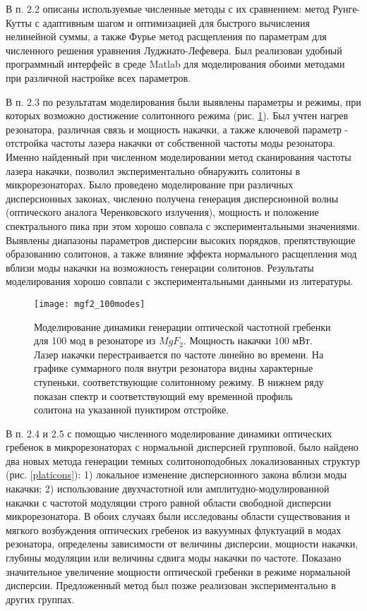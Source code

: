 В п. 2.2 описаны используемые численные методы с их сравнением: метод Рунге-Кутты с адаптивным шагом и оптимизацией для быстрого вычисления нелинейной суммы, а также Фурье метод расщепления по параметрам для численного решения уравнения Луджиато-Лефевера. Был реализован удобный программный интерфейс в среде Matlab для моделирования обоими методами при различной настройке всех параметров.

В п. 2.3 по результатам моделирования были выявлены параметры и режимы, при которых возможно достижение солитонного режима (рис. \ref{100modes}). Был учтен нагрев резонатора, различная связь и мощность накачки, а также ключевой параметр - отстройка частоты лазера накачки от собственной частоты моды резонатора. Именно найденный при численном моделировании метод сканирования частоты лазера накачки, позволил экспериментально обнаружить солитоны в микрорезонаторах. Было проведено моделирование при различных дисперсионных законах, численно получена генерация дисперсионной волны (оптического аналога Черенковского излучения), мощность и положение спектрального пика при этом хорошо совпала с экспериментальными значениями. Выявлены диапазоны параметров дисперсии высоких порядков, препятствующие образованию солитонов, а также влияние эффекта нормального расщепления мод вблизи моды накачки на возможность генерации солитонов. Результаты моделирования хорошо совпали с экспериментальными данными из литературы.

\begin{figure}
  \centering
  \texttt{[image: mgf2\_100modes]}
  \caption{Моделирование динамики генерации оптической частотной гребенки для 100 мод в резонаторе из $MgF_2$. Мощность накачки $100$ мВт. Лазер накачки перестраивается по частоте линейно во времени. На графике суммарного поля внутри резонатора видны характерные ступеньки, соответствующие солитонному режиму. В нижнем ряду показан спектр и соответствующий ему временной профиль солитона на указанной пунктиром отстройке.}
  \label{100modes}
\end{figure}

В п. 2.4 и 2.5 с помощью численного моделирование динамики оптических гребенок в микрорезонаторах с нормальной дисперсией групповой, было найдено два новых метода генерации темных солитоноподобных локализованных структур (рис. \ref{platicons}): 1) локальное изменение дисперсионного закона вблизи моды накачки; 2) использование двухчастотной или амплитудно-модулированной накачки с частотой модуляции строго равной области свободной дисперсии микрорезонатора. В обоих случаях были исследованы области существования и мягкого возбуждения оптических гребенок из вакуумных флуктуаций в модах резонатора, определены зависимости от величины дисперсии, мощности накачки, глубины модуляции или величины сдвига моды накачки по частоте. Показано значительное увеличение мощности оптической гребенки в режиме нормальной дисперсии. Предложенный метод был позже реализован экспериментально в других группах.

